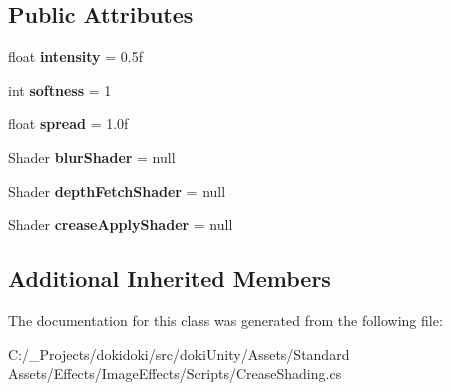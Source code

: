\subsection*{Public Attributes}
\begin{DoxyCompactItemize}
\item 
float {\bfseries intensity} = 0.\+5f\hypertarget{class_unity_standard_assets_1_1_image_effects_1_1_crease_shading_aa199f8c56f3d981085697dd18aefc8e9}{}\label{class_unity_standard_assets_1_1_image_effects_1_1_crease_shading_aa199f8c56f3d981085697dd18aefc8e9}

\item 
int {\bfseries softness} = 1\hypertarget{class_unity_standard_assets_1_1_image_effects_1_1_crease_shading_ae25217da7ffbb2a1ce93c7a7ff0d6e06}{}\label{class_unity_standard_assets_1_1_image_effects_1_1_crease_shading_ae25217da7ffbb2a1ce93c7a7ff0d6e06}

\item 
float {\bfseries spread} = 1.\+0f\hypertarget{class_unity_standard_assets_1_1_image_effects_1_1_crease_shading_a1b9d0a58714b3de96a34037b54619dc4}{}\label{class_unity_standard_assets_1_1_image_effects_1_1_crease_shading_a1b9d0a58714b3de96a34037b54619dc4}

\item 
Shader {\bfseries blur\+Shader} = null\hypertarget{class_unity_standard_assets_1_1_image_effects_1_1_crease_shading_aeb6788a00b36cb2329060575904b7585}{}\label{class_unity_standard_assets_1_1_image_effects_1_1_crease_shading_aeb6788a00b36cb2329060575904b7585}

\item 
Shader {\bfseries depth\+Fetch\+Shader} = null\hypertarget{class_unity_standard_assets_1_1_image_effects_1_1_crease_shading_ab9fe7c59fd430341cefb38972beada84}{}\label{class_unity_standard_assets_1_1_image_effects_1_1_crease_shading_ab9fe7c59fd430341cefb38972beada84}

\item 
Shader {\bfseries crease\+Apply\+Shader} = null\hypertarget{class_unity_standard_assets_1_1_image_effects_1_1_crease_shading_a0c806f11842a81c5193b14f374f9aa1b}{}\label{class_unity_standard_assets_1_1_image_effects_1_1_crease_shading_a0c806f11842a81c5193b14f374f9aa1b}

\end{DoxyCompactItemize}
\subsection*{Additional Inherited Members}


The documentation for this class was generated from the following file\+:\begin{DoxyCompactItemize}
\item 
C\+:/\+\_\+\+Projects/dokidoki/src/doki\+Unity/\+Assets/\+Standard Assets/\+Effects/\+Image\+Effects/\+Scripts/Crease\+Shading.\+cs\end{DoxyCompactItemize}
